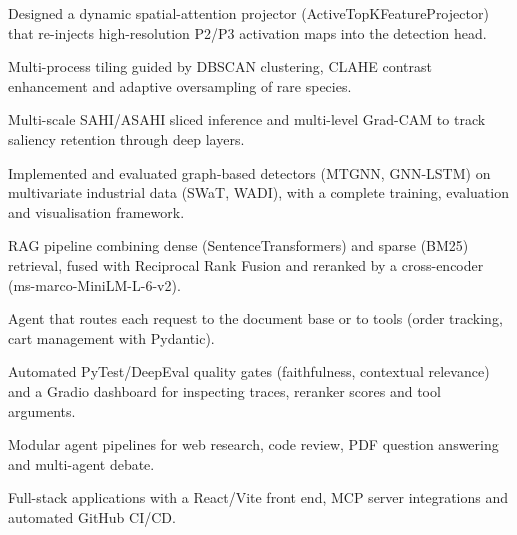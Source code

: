 \begin{cvitems}
  \item Designed a dynamic spatial-attention projector (ActiveTopKFeatureProjector) that re-injects high-resolution P2/P3 activation maps into the detection head.
  \item Multi-process tiling guided by DBSCAN clustering, CLAHE contrast enhancement and adaptive oversampling of rare species.
  \item Multi-scale SAHI/ASAHI sliced inference and multi-level Grad-CAM to track saliency retention through deep layers.
\end{cvitems}

\begin{cvitems}
  \item Implemented and evaluated graph-based detectors (MTGNN, GNN-LSTM) on multivariate industrial data (SWaT, WADI), with a complete training, evaluation and visualisation framework.
\end{cvitems}

\begin{cvitems}
  \item RAG pipeline combining dense (SentenceTransformers) and sparse (BM25) retrieval, fused with Reciprocal Rank Fusion and reranked by a cross-encoder (ms-marco-MiniLM-L-6-v2).
  \item Agent that routes each request to the document base or to tools (order tracking, cart management with Pydantic).
  \item Automated PyTest/DeepEval quality gates (faithfulness, contextual relevance) and a Gradio dashboard for inspecting traces, reranker scores and tool arguments.
\end{cvitems}

\begin{cvitems}
  \item Modular agent pipelines for web research, code review, PDF question answering and multi-agent debate.
  \item Full-stack applications with a React/Vite front end, MCP server integrations and automated GitHub CI/CD.
\end{cvitems}

